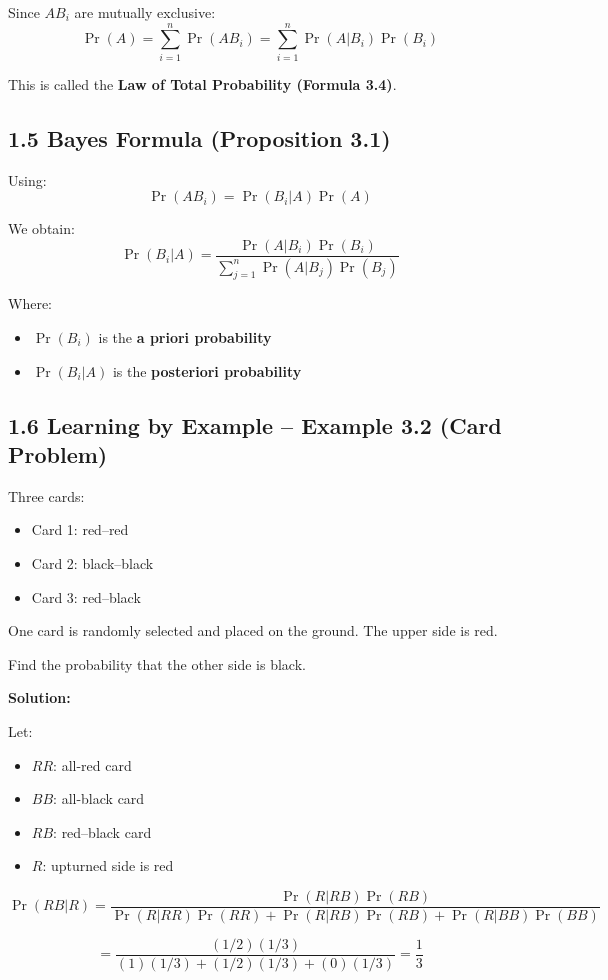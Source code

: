 \documentclass[12pt]{article}
\begin{document}
Since $AB_i$ are mutually exclusive:
\[
\Pr(A) = \sum_{i=1}^{n} \Pr(AB_i)
= \sum_{i=1}^{n} \Pr(A|B_i)\Pr(B_i)
\]

This is called the \textbf{Law of Total Probability (Formula 3.4)}.

\subsection*{1.5 Bayes Formula (Proposition 3.1)}

Using:
\[
\Pr(AB_i) = \Pr(B_i|A)\Pr(A)
\]

We obtain:
\[
\Pr(B_i|A) =
\frac{\Pr(A|B_i)\Pr(B_i)}
{\sum_{j=1}^{n} \Pr(A|B_j)\Pr(B_j)}
\]

Where:
\begin{itemize}
    \item $\Pr(B_i)$ is the \textbf{a priori probability}
    \item $\Pr(B_i|A)$ is the \textbf{posteriori probability}
\end{itemize}

\subsection*{1.6 Learning by Example – Example 3.2 (Card Problem)}

Three cards:
\begin{itemize}
    \item Card 1: red--red
    \item Card 2: black--black
    \item Card 3: red--black
\end{itemize}

One card is randomly selected and placed on the ground.  
The upper side is red.

Find the probability that the other side is black.

\textbf{Solution:}

Let:
\begin{itemize}
    \item $RR$: all-red card
    \item $BB$: all-black card
    \item $RB$: red--black card
    \item $R$: upturned side is red
\end{itemize}

\[
\Pr(RB|R) =
\frac{\Pr(R|RB)\Pr(RB)}
{\Pr(R|RR)\Pr(RR) + \Pr(R|RB)\Pr(RB) + \Pr(R|BB)\Pr(BB)}
\]

\[
= \frac{(1/2)(1/3)}{(1)(1/3) + (1/2)(1/3) + (0)(1/3)} = \frac{1}{3}
\]
\end{document}
